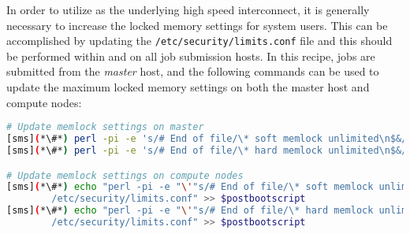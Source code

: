 In order to utilize \InfiniBand{} as the underlying high speed interconnect, it is
generally necessary to increase the locked memory settings for system
users. This can be accomplished by updating
the \texttt{/etc/security/limits.conf} file and this should be performed within
and on all job submission hosts. In this recipe, jobs
are submitted from the {\em master} host, and the following commands can be
used to update the maximum locked memory settings on both the master host and compute nodes:

\begin{lstlisting}[language=bash,keywords={},upquote=true]
# Update memlock settings on master
[sms](*\#*) perl -pi -e 's/# End of file/\* soft memlock unlimited\n$&/s' /etc/security/limits.conf
[sms](*\#*) perl -pi -e 's/# End of file/\* hard memlock unlimited\n$&/s' /etc/security/limits.conf

# Update memlock settings on compute nodes
[sms](*\#*) echo "perl -pi -e "\'"s/# End of file/\* soft memlock unlimited\n$&/s"\'" \
        /etc/security/limits.conf" >> $postbootscript
[sms](*\#*) echo "perl -pi -e "\'"s/# End of file/\* hard memlock unlimited\n$&/s"\'" \
        /etc/security/limits.conf" >> $postbootscript
\end{lstlisting}


